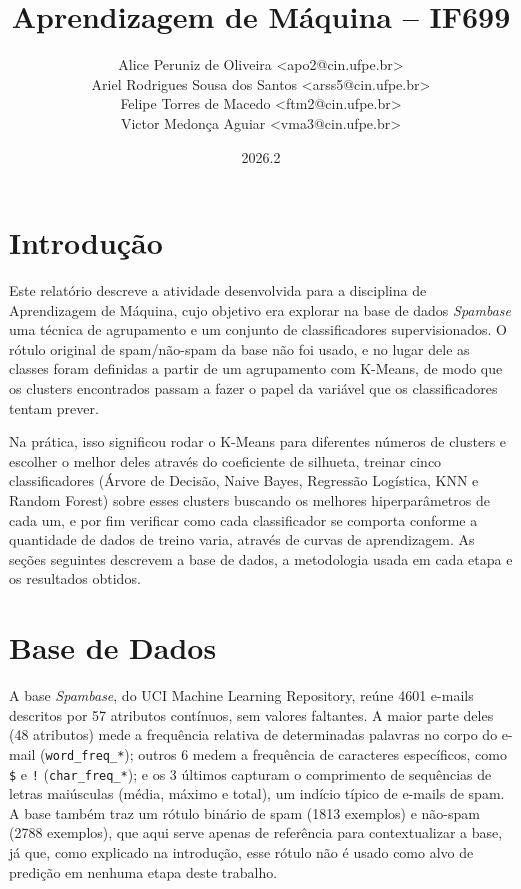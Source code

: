 \documentclass[a4paper,10pt]{article}
\title{Aprendizagem de Máquina -- IF699}
\author{
Alice Peruniz de Oliveira <apo2@cin.ufpe.br> \\
Ariel Rodrigues Sousa dos Santos <arss5@cin.ufpe.br> \\
Felipe Torres de Macedo <ftm2@cin.ufpe.br> \\
Victor Medonça Aguiar <vma3@cin.ufpe.br>
}
\date{2026.2}
\begin{document}
\maketitle

\section{Introdução}

Este relatório descreve a atividade desenvolvida para a disciplina de Aprendizagem de Máquina, cujo objetivo era explorar na base de dados \textit{Spambase} uma técnica de agrupamento e um conjunto de classificadores supervisionados. O rótulo original de spam/não-spam da base não foi usado, e no lugar dele as classes foram definidas a partir de um agrupamento com K-Means, de modo que os clusters encontrados passam a fazer o papel da variável que os classificadores tentam prever.

Na prática, isso significou rodar o K-Means para diferentes números de clusters e escolher o melhor deles através do coeficiente de silhueta, treinar cinco classificadores (Árvore de Decisão, Naive Bayes, Regressão Logística, KNN e Random Forest) sobre esses clusters buscando os melhores hiperparâmetros de cada um, e por fim verificar como cada classificador se comporta conforme a quantidade de dados de treino varia, através de curvas de aprendizagem. As seções seguintes descrevem a base de dados, a metodologia usada em cada etapa e os resultados obtidos.

\section{Base de Dados}

A base \textit{Spambase}, do UCI Machine Learning Repository, reúne 4601 e-mails descritos por 57 atributos contínuos, sem valores faltantes. A maior parte deles (48 atributos) mede a frequência relativa de determinadas palavras no corpo do e-mail (\texttt{word\_freq\_*}); outros 6 medem a frequência de caracteres específicos, como \texttt{\$} e \texttt{!} (\texttt{char\_freq\_*}); e os 3 últimos capturam o comprimento de sequências de letras maiúsculas (média, máximo e total), um indício típico de e-mails de spam. A base também traz um rótulo binário de spam (1813 exemplos) e não-spam (2788 exemplos), que aqui serve apenas de referência para contextualizar a base, já que, como explicado na introdução, esse rótulo não é usado como alvo de predição em nenhuma etapa deste trabalho.
\end{document}
